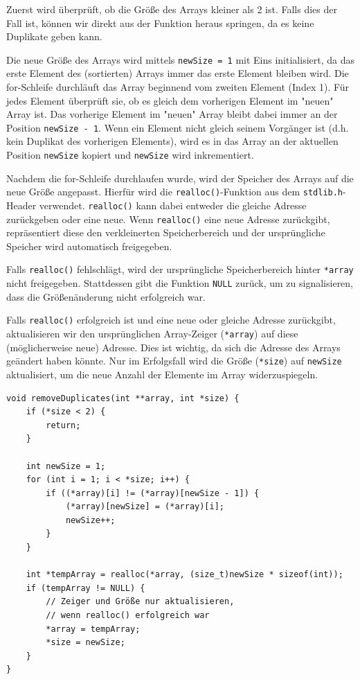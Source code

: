 Zuerst wird überprüft, ob die Größe des Arrays kleiner als 2 ist. Falls dies der
Fall ist, können wir direkt aus der Funktion heraus springen, da es keine
Duplikate geben kann.

Die neue Größe des Arrays wird mittels \texttt{newSize = 1} mit Eins
initialisiert, da das erste Element des (sortierten) Arrays immer das erste
Element bleiben wird. Die for-Schleife durchläuft das Array beginnend vom
zweiten Element (Index 1). Für jedes Element überprüft sie, ob es gleich dem
vorherigen Element im "neuen" Array ist. Das vorherige Element im "neuen" Array
bleibt dabei immer an der Position \texttt{newSize - 1}. Wenn ein Element
nicht gleich seinem Vorgänger ist (d.h. kein Duplikat des vorherigen Elements),
wird es in das Array an der aktuellen Position \texttt{newSize} kopiert
und \texttt{newSize} wird inkrementiert.

Nachdem die for-Schleife durchlaufen wurde, wird der Speicher des Arrays auf die
neue Größe angepasst. Hierfür wird die \texttt{realloc()}-Funktion aus
dem \texttt{stdlib.h}-Header verwendet. \texttt{realloc()} kann
dabei entweder die gleiche Adresse zurückgeben oder eine neue. Wenn
\texttt{realloc()} eine neue Adresse zurückgibt, repräsentiert diese den
verkleinerten Speicherbereich und der ursprüngliche Speicher wird automatisch
freigegeben.

Falls \texttt{realloc()} fehlschlägt, wird der ursprüngliche
Speicherbereich hinter \texttt{*array} nicht freigegeben. Stattdessen
gibt die Funktion \texttt{NULL} zurück, um zu signalisieren, dass die
Größenänderung nicht erfolgreich war.

Falls \texttt{realloc()} erfolgreich ist und eine neue oder gleiche
Adresse zurückgibt, aktualisieren wir den ursprünglichen Array-Zeiger
(\texttt{*array}) auf diese (möglicherweise neue) Adresse. Dies ist
wichtig, da sich die Adresse des Arrays geändert haben könnte. Nur im
Erfolgsfall wird die Größe (\texttt{*size}) auf \texttt{newSize}
aktualisiert, um die neue Anzahl der Elemente im Array widerzuspiegeln.

\begin{verbatim}
void removeDuplicates(int **array, int *size) {
    if (*size < 2) {
        return;
    }

    int newSize = 1;
    for (int i = 1; i < *size; i++) {
        if ((*array)[i] != (*array)[newSize - 1]) {
            (*array)[newSize] = (*array)[i];
            newSize++;
        }
    }

    int *tempArray = realloc(*array, (size_t)newSize * sizeof(int));
    if (tempArray != NULL) {
        // Zeiger und Größe nur aktualisieren,
        // wenn realloc() erfolgreich war
        *array = tempArray;
        *size = newSize;
    }
}
\end{verbatim}







